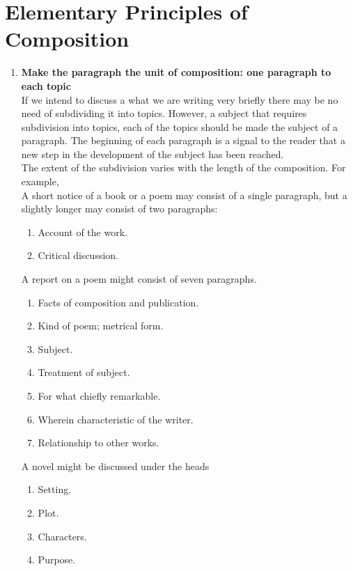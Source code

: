\documentclass{report}
\begin{document}
\chapter{\color{blue}Elementary Principles of Composition}
\label{chap3}
\begin{enumerate}
	
	\item \textbf{Make the paragraph the unit of composition: one paragraph to each topic}\\
	
	If we intend to discuss a what we are writing very briefly there may be no need of subdividing it into topics. However, a subject that requires subdivision into topics, each of the topics should be made the subject of a paragraph. The beginning of each paragraph is a signal to the reader that a new step in the development of the subject has been reached.\\
	The extent of the subdivision varies with the length of the composition. For example,\\
	A short notice of a book or a poem may consist of a single paragraph, but a slightly longer may consist of two paragraphs:\\
	\begin{enumerate}
		\item Account of the work.
		\item Critical discussion.
	\end{enumerate}
	A report on a poem might consist of seven paragraphs.\\
	\begin{enumerate}
		\item  Facts of composition and publication.
		\item Kind of poem; metrical form.
		\item Subject.
		\item Treatment of subject.
		\item For what chiefly remarkable.
		\item Wherein characteristic of the writer.
		\item Relationship to other works.
	\end{enumerate}
	
	A novel might be discussed under the heads
	\begin{enumerate}
		\item Setting.
		\item Plot.
		\item Characters.
		\item Purpose.
	\end{enumerate}
	

\end{enumerate}
\end{document}
